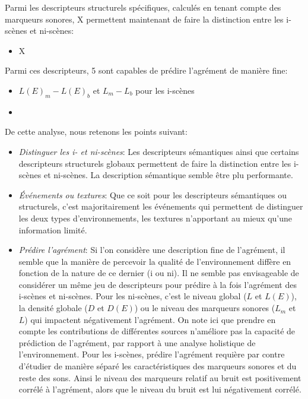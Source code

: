 Parmi les descripteurs structurels spécifiques, calculés en tenant compte des marqueurs sonores, X permettent maintenant de faire la distinction entre les i-scènes et ni-scènes:

\begin{itemize}
\item X
\end{itemize}

Parmi ces descripteurs, 5 sont capables de prédire l'agrément de manière fine: 

\begin{itemize}
\item $L(E)_m-L(E)_b$ et $L_m-L_b$ pour les i-scènes
\item 
\end{itemize}

De cette analyse, nous retenons les points suivant:

\begin{itemize}
\item \emph{Distinguer les i- et ni-scènes}: Les descripteurs sémantiques ainsi que certains descripteurs structurels globaux permettent de faire la distinction entre les i-scènes et ni-scènes. La description sémantique semble être plu performante.
\item \emph{Événements ou textures}: Que ce soit pour les descripteurs sémantiques ou structurels, c'est majoritairement les événements qui permettent de distinguer les deux types d'environnements, les textures n'apportant au mieux qu'une information limité.
\item \emph{Prédire l'agrément}: Si l'on considère une description fine de l'agrément, il semble que la manière de percevoir la qualité de l'environnement diffère en fonction de la nature de ce dernier (i ou ni). Il ne semble pas envisageable de considérer un même jeu de descripteurs pour prédire à la fois l'agrément des i-scènes et ni-scènes. Pour les ni-scènes, c'est le niveau global ($L$ et $L(E)$), la densité globale ($D$ et $D(E)$) ou le niveau des marqueurs sonores ($L_m$ et $L$)  qui impactent négativement l'agrément. On note ici que prendre en compte les contributions de différentes sources n'améliore pas la capacité de prédiction de l'agrément, par rapport à une analyse holistique de l'environnement. Pour les i-scènes, prédire l'agrément requière par contre d'étudier de manière séparé les caractéristiques des marqueurs sonores et du reste des sons. Ainsi le niveau des marqueurs relatif au bruit est positivement corrélé à l'agrément, alors que le niveau du bruit est lui négativement corrélé.  
\end{itemize}

